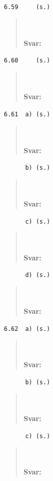 \documentclass[a4paper]{article}
\newcommand{\tskcol}[1]{\textcolor{tskcol}{#1}}
\begin{document}
	\texttt{\tskcol{6.59~~~~ (s.)}}
	\begin{quotation}
		\noindent
		\\ \\
		\textbf{Svar:}
	\end{quotation}
	
	\texttt{\tskcol{6.60~~~~ (s.)}}
	\begin{quotation}
		\noindent
		\\ \\
		\textbf{Svar:}
	\end{quotation}
	
	\texttt{\tskcol{6.61~~a) (s.)}}
	\begin{quotation}
		\noindent
		\\ \\
		\textbf{Svar:}
	\end{quotation}
	
	\texttt{\tskcol{~~~~~~b) (s.)}}
	\begin{quotation}
		\noindent
		\\ \\
		\textbf{Svar:}
	\end{quotation}
	
	\texttt{\tskcol{~~~~~~c) (s.)}}
	\begin{quotation}
		\noindent
		\\ \\
		\textbf{Svar:}
	\end{quotation}
	
	\texttt{\tskcol{~~~~~~d) (s.)}}
	\begin{quotation}
		\noindent
		\\ \\
		\textbf{Svar:}
	\end{quotation}
	
	\texttt{\tskcol{6.62~~a) (s.)}}
	\begin{quotation}
		\noindent
		\\ \\
		\textbf{Svar:}
	\end{quotation}
	
	\texttt{\tskcol{~~~~~~b) (s.)}}
	\begin{quotation}
		\noindent
		\\ \\
		\textbf{Svar:}
	\end{quotation}
	
	\texttt{\tskcol{~~~~~~c) (s.)}}
	\begin{quotation}
		\noindent
		\\ \\
		\textbf{Svar:}
	\end{quotation}
	
\end{document}

